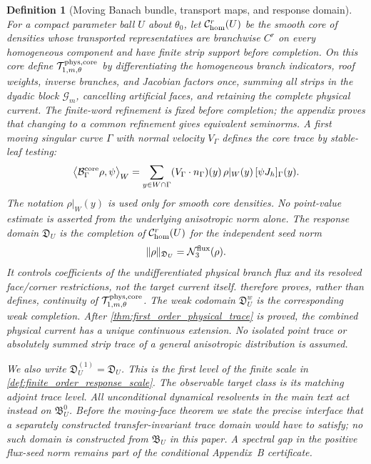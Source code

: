 \documentclass[11pt]{amsart}
\theoremstyle{compactplain}
\theoremstyle{compactdefinition}
\newtheorem{definition}[theorem]{Definition}
\theoremstyle{compactremark}
\begin{document}
\begin{definition}[Moving Banach bundle, transport maps, and response domain]
For a compact parameter ball $U$ about $\theta_0$, let
\(\mathcal C_{\rm hom}^r(U)\) be the smooth core of densities whose transported
representatives are branchwise \(C^r\) on every homogeneous component and have
finite strip support before completion.  On this core define
\(\mathcal T_{1,m,\theta}^{\rm phys,core}\) by differentiating
the homogeneous branch indicators, roof weights, inverse branches, and
Jacobian factors once, summing all strips in the dyadic block
\(\mathcal G_m\), cancelling artificial faces, and retaining the complete
physical current.  The finite-word refinement is fixed before completion; the
appendix proves that changing to a common refinement gives equivalent
seminorms.  A first moving singular curve $\Gamma$ with normal velocity
$V_\Gamma$ defines the core trace by stable-leaf testing:
\begin{equation}
\label{eq:core_trace_pairing}
  \big\langle \mathcal B_\Gamma^{\rm core}\rho,\psi\big\rangle_W
  =
  \sum_{y\in W\cap\Gamma}
  (V_\Gamma\cdot n_\Gamma)(y)\,\rho|_W(y)\,[\psi J_h]_\Gamma(y).
\end{equation}
The notation \(\rho|_W(y)\) is used only for smooth core densities.  No
point-value estimate is asserted from the underlying anisotropic norm alone.
The response domain \(\mathfrak D_U\) is the completion of
\(\mathcal C_{\rm hom}^r(U)\) for the independent seed norm
\begin{equation}
  \|\rho\|_{\mathfrak D_U}
  =\mathcal N_3^{\rm flux}(\rho).
\end{equation}
It controls coefficients of the undifferentiated physical branch flux and its
resolved face/corner restrictions, not the target current itself.
 therefore proves, rather than
defines, continuity of
\(\mathcal T_{1,m,\theta}^{\rm phys,core}\).  The weak
codomain $\mathfrak D_U^w$ is the corresponding weak completion.  After
\cref{thm:first_order_physical_trace} is proved, the combined physical current
has a unique continuous extension.  No isolated point trace or absolutely
summed strip trace of a general anisotropic distribution is assumed.

We also write \(\mathfrak D_U^{(1)}=\mathfrak D_U\).  This is the first level
of the finite scale in \cref{def:finite_order_response_scale}.  The observable
target class is its matching adjoint trace level.
All unconditional dynamical resolvents in the main text act instead on
\(\mathfrak B_U^0\).  Before the moving-face theorem we state the precise
interface that a separately constructed transfer-invariant trace domain would
have to satisfy; no such domain is constructed from \(\mathfrak B_U\) in this
paper.  A spectral gap in the positive flux-seed norm remains part of the
conditional Appendix~B certificate.
\end{definition}
\end{document}
